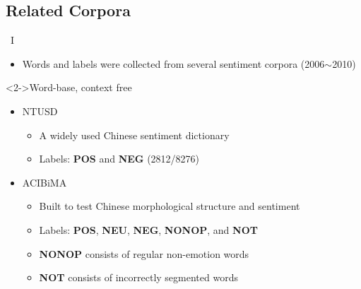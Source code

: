 \documentclass[compress]{beamer}
\begin{document}
    \subsection{Related Corpora}
        \begin{frame}{\subsecname\ I}
            \begin{itemize}
                \item<1-> Words and labels were collected from several sentiment corpora (2006$\sim$2010)
            \end{itemize}
            \begin{block}<2->{Word-base, context free}
                \begin{itemize}
                    \item<2-> NTUSD
                        \begin{itemize}
                            \item<3-> A widely used Chinese sentiment dictionary
                            \item<4-> Labels: \textbf{POS} and \textbf{NEG} (2812/8276) 
                        \end{itemize}
                    \item<2-> ACIBiMA
                        \begin{itemize}
                            \item<3-> Built to test Chinese morphological structure and sentiment
                            \item<4-> Labels: \textbf{POS}, \textbf{NEU}, \textbf{NEG}, \textbf{NONOP}, and \textbf{NOT}
                            \item<4-> \textbf{NONOP} consists of regular non-emotion words
                            \item<4-> \textbf{NOT} consists of incorrectly segmented words
                        \end{itemize}
                \end{itemize}
            \end{block}
        \end{frame}
\end{document}
